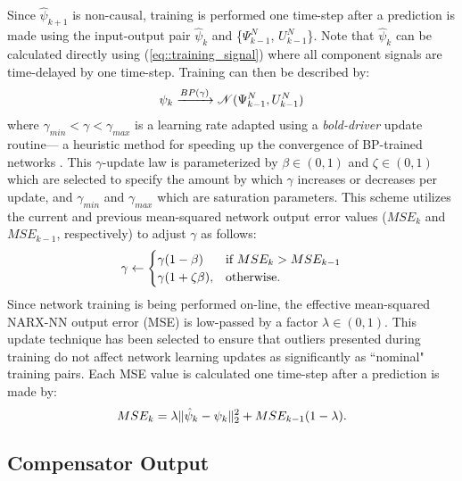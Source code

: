 \vspace{-4mm}
Since $\hat{\psi}_{k+1}$ is non-causal, training is performed one time-step after a prediction is made using the input-output pair $\hat{\psi}_{k}$ and \{${\Psi}_{k-1}^{N}$, ${U}_{k-1}^{N}$\}. Note that $\hat{\psi}_{k}$ can be calculated directly using (\ref{eq::training_signal}) where all component signals are time-delayed by one time-step. Training can then be described by:
	\begin{equation}
		\vspace{-1mm}
		\psi_{k} \xrightarrow{BP(\gamma)} \mathscr{N}({\Psi}_{k-1}^{N},{U}_{k-1}^{N})
		\label{eq::training}
	\end{equation}
where $\gamma _{min} < \gamma < \gamma _{max}$ is a learning rate adapted using a \emph{bold-driver} update routine--- a heuristic method for speeding up the convergence of BP-trained networks \cite{Battiti1992,Magoulas1999}. This $\gamma$-update law is parameterized by $\beta \in (0,1)$ and $\zeta \in (0,1)$ which are selected to specify the amount by which $\gamma$ increases or decreases per update, and $\gamma _{min}$ and $\gamma _{max}$ which are saturation parameters. This scheme utilizes the current and previous mean-squared network output error values ($MSE_{k}$ and $MSE_{k-1}$, respectively) to adjust $\gamma$ as follows:
	\begin{equation}
		\vspace{-1mm}
	    \gamma \leftarrow 
		\begin{cases}
	    \gamma (1- \beta) 		& \text{if } MSE_{k} > MSE_{k-1}\\
	    \gamma (1+\zeta \beta),& \text{otherwise}.
		\end{cases}
	\end{equation}
Since network training is being performed on-line, the effective mean-squared NARX-NN  output error (MSE) is low-passed by a factor $\lambda \in \left(0,1\right)$. This update technique has been selected to ensure that outliers presented during training do not affect network learning updates as significantly as ``nominal" training pairs. Each \kth \hspace{0.25mm} MSE value is calculated one time-step after a prediction is made by:
	\begin{equation}
		\vspace{-1mm}
		MSE_{k} = \lambda \|\hat{\psi}_{k} - \psi_{k}\|_{2}^{2} + MSE_{k-1}(1-\lambda).
	\end{equation}


\subsection{Compensator Output}

